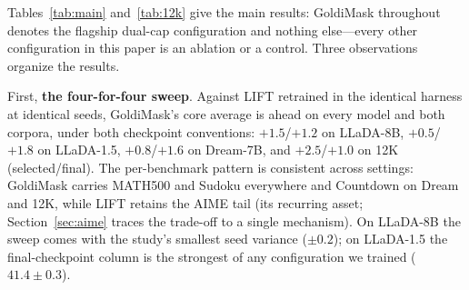 \documentclass{article} %
\begin{document}
\begin{table}[t]
\caption{\textbf{GoldiMask (dual-cap) is robust to the training dataset.} Same protocol on LIFT-SFT-12K (LIFT's stronger variant there is $H{=}2$); layout as Table~\ref{tab:main}. $^\circ$base row from \citet{lift2026}.}
\label{tab:12k}
\begin{center}
\end{center}
\end{table}

Tables~\ref{tab:main} and~\ref{tab:12k} give the main results: GoldiMask throughout denotes the flagship dual-cap configuration and nothing else---every other configuration in this paper is an ablation or a control. Three observations organize the results.

First, \textbf{the four-for-four sweep}. Against LIFT retrained in the identical harness at identical seeds, GoldiMask's core average is ahead on every model and both corpora, under both checkpoint conventions: $+1.5$/$+1.2$ on LLaDA-8B, $+0.5$/$+1.8$ on LLaDA-1.5, $+0.8$/$+1.6$ on Dream-7B, and $+2.5$/$+1.0$ on 12K (selected/final). The per-benchmark pattern is consistent across settings: GoldiMask carries MATH500 and Sudoku everywhere and Countdown on Dream and 12K, while LIFT retains the AIME tail (its recurring asset; Section~\ref{sec:aime} traces the trade-off to a single mechanism). On LLaDA-8B the sweep comes with the study's smallest seed variance ($\pm 0.2$); on LLaDA-1.5 the final-checkpoint column is the strongest of any configuration we trained ($41.4 \pm 0.3$).
\end{document}
